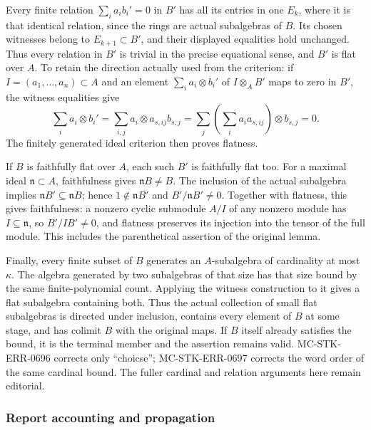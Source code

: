 Every finite relation \(\sum_i a_i b_i'=0\) in \(B'\) has all its entries in one \(E_k\), where it is that identical relation, since the rings are actual subalgebras of \(B\). Its chosen witnesses belong to \(E_{k+1}\subset B'\), and their displayed equalities hold unchanged. Thus every relation in \(B'\) is trivial in the precise equational sense, and \(B'\) is flat over \(A\). To retain the direction actually used from the criterion: if \(I=(a_1,\ldots,a_n)\subset A\) and an element \(\sum_i a_i\otimes b_i'\) of \(I\otimes_A B'\) maps to zero in \(B'\), the witness equalities give \[
 \sum_i a_i\otimes b_i'
 =\sum_{i,j}a_i\otimes a_{s,ij}b_{s,j}
 =\sum_j\left(\sum_i a_i a_{s,ij}\right)\otimes b_{s,j}
 =0.
\] The finitely generated ideal criterion then proves flatness.

If \(B\) is faithfully flat over \(A\), each such \(B'\) is faithfully flat too. For a maximal ideal \(\mathfrak n\subset A\), faithfulness gives \(\mathfrak nB\ne B\). The inclusion of the actual subalgebra implies \(\mathfrak nB'\subseteq\mathfrak nB\); hence \(1\notin\mathfrak nB'\) and \(B'/\mathfrak nB'\ne0\). Together with flatness, this gives faithfulness: a nonzero cyclic submodule \(A/I\) of any nonzero module has \(I\subseteq\mathfrak n\), so \(B'/IB'\ne0\), and flatness preserves its injection into the tensor of the full module. This includes the parenthetical assertion of the original lemma.

Finally, every finite subset of \(B\) generates an \(A\)-subalgebra of cardinality at most \(\kappa\). The algebra generated by two subalgebras of that size has that size bound by the same finite-polynomial count. Applying the witness construction to it gives a flat subalgebra containing both. Thus the actual collection of small flat subalgebras is directed under inclusion, contains every element of \(B\) at some stage, and has colimit \(B\) with the original maps. If \(B\) itself already satisfies the bound, it is the terminal member and the assertion remains valid. MC-\AlgebraIdentifierBreak{}STK-\AlgebraIdentifierBreak{}ERR-\AlgebraIdentifierBreak{}0696 corrects only ``choicse''; MC-\AlgebraIdentifierBreak{}STK-\AlgebraIdentifierBreak{}ERR-\AlgebraIdentifierBreak{}0697 corrects the word order of the same cardinal bound. The fuller cardinal and relation arguments here remain editorial.

\subsubsection{Report accounting and propagation}\label{algebra-proof-064-report-accounting-and-propagation}

